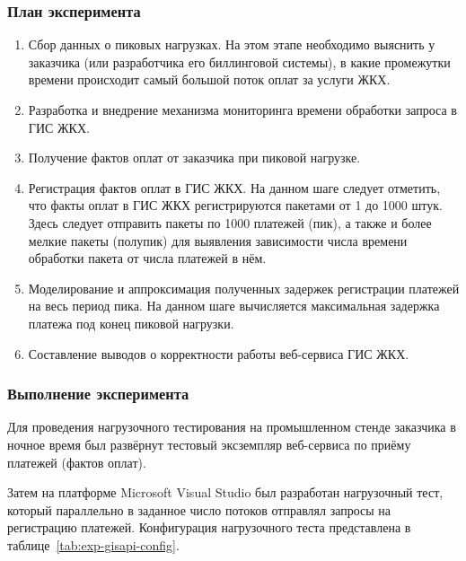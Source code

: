 \subsubsection*{План эксперимента}

\begin{enumerate}
	\item Сбор данных о пиковых нагрузках. На этом этапе необходимо выяснить у заказчика (или разработчика его биллинговой системы), в какие промежутки времени происходит самый большой поток оплат за услуги ЖКХ.
	\item Разработка и внедрение механизма мониторинга времени обработки запроса в ГИС ЖКХ.
	\item Получение фактов оплат от заказчика при пиковой нагрузке.
	\item Регистрация фактов оплат в ГИС ЖКХ. На данном шаге следует отметить, что факты оплат в ГИС ЖКХ регистрируются пакетами от 1 до 1000 штук. Здесь следует отправить пакеты по 1000 платежей (пик), а также и более мелкие пакеты (полупик) для выявления зависимости числа времени обработки пакета от числа платежей в нём.
	\item Моделирование и аппроксимация полученных задержек регистрации платежей на весь период пика. На данном шаге вычисляется максимальная задержка платежа под конец пиковой нагрузки.
	\item Составление выводов о корректности работы веб-сервиса ГИС ЖКХ.
\end{enumerate}

\subsubsection*{Выполнение эксперимента}

Для проведения нагрузочного тестирования на промышленном стенде заказчика в ночное время был развёрнут тестовый эксземпляр веб-сервиса по приёму платежей (фактов оплат).

Затем на платформе Microsoft Visual Studio был разработан нагрузочный тест, который параллельно в заданное число потоков отправлял запросы на регистрацию платежей.
Конфигурация нагрузочного теста представлена в таблице~\ref{tab:exp-gisapi-config}.

